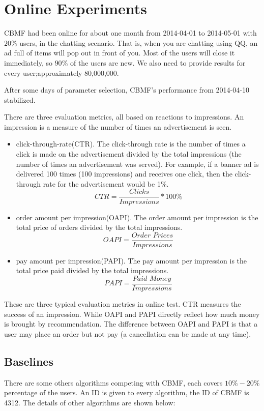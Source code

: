 \section{Online Experiments}


CBMF had been online for about one month from 2014-04-01 to 2014-05-01 with $20\%$ users, in the chatting scenario. That is, when you are chatting using QQ, an ad full of items will pop out in front of you. Most of the users will close it immediately, so $90\%$ of the users are new. We also need to provide results for every user;approximately 80,000,000.

After some days of parameter selection, CBMF's performance from 2014-04-10 stabilized. 

There are three evaluation metrics, all based on reactions to impressions. An impression is a measure of the number of times an advertisement is seen. 
\begin{itemize}
\item  click-through-rate(CTR). The click-through rate is the number of times a click is made on the advertisement divided by the total impressions (the number of times an advertisement was served). For example, if a banner ad is  delivered 100 times (100 impressions) and receives one click, then the click-through rate for the advertisement would be 1\%. $$CTR = \frac{Clicks}{Impressions} * 100\%$$
\item  order amount per impression(OAPI). The order amount per impression is the total price of orders divided by the total impressions. $$OAPI = \frac{Order \,\,Prices}{Impressions}$$
\item  pay amount per impression(PAPI). The pay amount per impression is the total price paid divided by the total impressions.$$PAPI = \frac{Paid \,\,Money}{Impressions}$$
\end{itemize}

These are three typical evaluation metrics in online test. CTR measures the success of an impression. While OAPI and PAPI directly reflect how much money is brought by recommendation. The difference between OAPI and PAPI is that a user may place an order but not pay (a cancellation can be made at any time).

\subsection{Baselines}

There are some others algorithms competing with CBMF, each covers $10\%-20\%$ percentage of the users. An ID is given to every algorithm, the ID of CBMF is 4312. The details of other algorithms are shown below:


